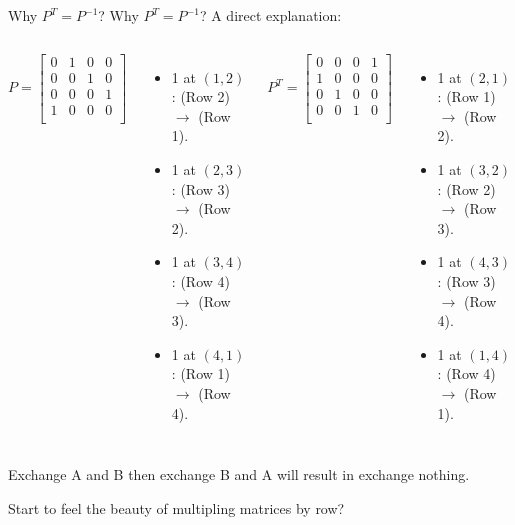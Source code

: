 \documentclass{beamer}
\begin{document}
\begin{frame}{Why $P^T=P^{-1}$?}
Why $P^T=P^{-1}$? A direct explanation:
\vspace{3pt}

\begin{columns}
\begin{equation*}
    P=\left[ \begin{matrix}
        0&		1&		0&		0\\
        0&		0&		1&		0\\
        0&		0&		0&		1\\
        1&		0&		0&		0\\
    \end{matrix} \right]
\end{equation*}

\begin{itemize}
    \item 1 at $(1,2)$: (Row 2) $\rightarrow$ (Row 1).
    \item 1 at $(2,3)$: (Row 3) $\rightarrow$ (Row 2).
    \item 1 at $(3,4)$: (Row 4) $\rightarrow$ (Row 3).
    \item 1 at $(4,1)$: (Row 1) $\rightarrow$ (Row 4).
\end{itemize}

\begin{equation*}
    P^T=\left[ \begin{matrix}
        0&		0&		0&		1\\
        1&		0&		0&		0\\
        0&		1&		0&		0\\
        0&		0&		1&		0\\
    \end{matrix} \right]
\end{equation*}

\begin{itemize}
    \item 1 at $(2,1)$: (Row 1) $\rightarrow$ (Row 2).
    \item 1 at $(3,2)$: (Row 2) $\rightarrow$ (Row 3).
    \item 1 at $(4,3)$: (Row 3) $\rightarrow$ (Row 4).
    \item 1 at $(1,4)$: (Row 4) $\rightarrow$ (Row 1).
\end{itemize}
\end{columns}

\vspace{7pt}
Exchange A and B then exchange B and A will result in exchange nothing.

\vspace{3pt}
Start to feel the beauty of multipling matrices by row?
\end{frame}
\end{document}
